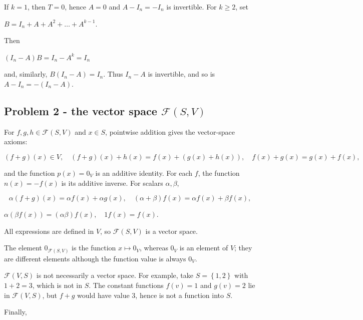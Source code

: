 If \(k = 1\), then \(T = 0\), hence \(A = 0\) and \(A - I_{n} = - I_{n}\) is invertible. For \(k \geq 2\), set

\(B = I_{n} + A + A^{2} + \ldots + A^{k - 1}.\)

Then

\(\left( {I_{n} - A} \right)B = I_{n} - A^{k} = I_{n}\)

and, similarly, \(B\left( {I_{n} - A} \right) = I_{n}\). Thus \(I_{n} - A\) is invertible, and so is \(A - I_{n} = - \left( {I_{n} - A} \right)\).

\subsection{\texorpdfstring{Problem 2 - the vector space \(\mathcal{F}\left( {S,V} \right)\)}{Problem 2 - the vector space \textbackslash mathcal\{F\}\textbackslash left( \{S,V\} \textbackslash right)}}

For \(f,g,h \in \mathcal{F}\left( {S,V} \right)\) and \(x \in S\), pointwise addition gives the vector-space axioms:

\[\left( {f + g} \right)(x) \in V,\quad\left( {f + g} \right)(x) + h(x) = f(x) + \left( {g(x) + h(x)} \right),\quad f(x) + g(x) = g(x) + f(x),\]

and the function \(p(x) = 0_{V}\) is an additive identity. For each \(f\), the function \(n(x) = - f(x)\) is its additive inverse. For scalars \(\alpha,\beta\),

\[\alpha\left( {f + g} \right)(x) = \alpha f(x) + \alpha g(x),\quad\left( {\alpha + \beta} \right)f(x) = \alpha f(x) + \beta f(x),\]

\(\alpha\left( {\beta f(x)} \right) = \left( {\alpha\beta} \right)f(x),\quad 1f(x) = f(x).\)

All expressions are defined in \(V\), so \(\mathcal{F}\left( {S,V} \right)\) is a vector space.

The element \(0_{\mathcal{F}{({S,V})}}\) is the function \(x\mapsto 0_{V}\), whereas \(0_{V}\) is an element of \(V\); they are different elements although the function value is always \(0_{V}\).

\(\mathcal{F}\left( {V,S} \right)\) is not necessarily a vector space. For example, take \(S = \left\{ {1,2} \right\}\) with \(1 + 2 = 3\), which is not in \(S\). The constant functions \(f(v) = 1\) and \(g(v) = 2\) lie in \(\mathcal{F}\left( {V,S} \right)\), but \(f + g\) would have value \(3\), hence is not a function into \(S\).

Finally,

